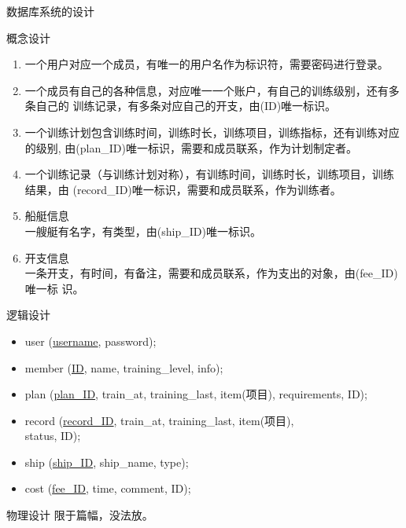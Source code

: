 \documentclass{beamer}
\begin{document}
\begin{frame}{数据库系统的设计}
   {
    概念设计

    \begin{enumerate}
    \item
      {
        一个用户对应一个成员，有唯一的用户名作为标识符，需要密码进行登录。
      }

    \item{
        一个成员有自己的各种信息，对应唯一一个账户，有自己的训练级别，还有多条自己的
        训练记录，有多条对应自己的开支，由(ID)唯一标识。
      }

    \item{
        一个训练计划包含训练时间，训练时长，训练项目，训练指标，还有训练对应的级别,
        由(plan\_ID)唯一标识，需要和成员联系，作为计划制定者。
      }

    \item {
        一个训练记录（与训练计划对称），有训练时间，训练时长，训练项目，训练结果，由
        (record\_ID)唯一标识，需要和成员联系，作为训练者。
      }
      
    \item {船艇信息\\
        一艘艇有名字，有类型，由(ship\_ID)唯一标识。
      }

    \item {开支信息\\
        一条开支，有时间，有备注，需要和成员联系，作为支出的对象，由(fee\_ID)唯一标
        识。
      }
    \end{enumerate}    
    
  }

   {
    逻辑设计

    \begin{itemize}
      \item user (\underline{username}, password);
      \item member (\underline{ID}, name, training\_level, info);
      \item plan (\underline{plan\_ID}, train\_at, training\_last, item(项目),
        requirements, ID);
      \item record (\underline{record\_ID}, train\_at, training\_last, item(项目),\\
        status, ID);
      \item ship (\underline{ship\_ID}, ship\_name, type);
      \item cost (\underline{fee\_ID}, time, comment, ID);
    \end{itemize}
    
    
  }

   {
    物理设计
    限于篇幅，没法放。
  }






    
\end{frame}
\end{document}
